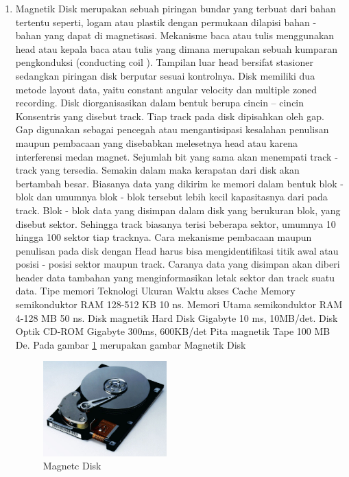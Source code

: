 \begin{enumerate}
\item Magnetik Disk merupakan sebuah piringan bundar yang terbuat dari bahan tertentu seperti, logam atau plastik dengan permukaan dilapisi bahan - bahan yang dapat di magnetisasi. Mekanisme baca atau tulis menggunakan head atau kepala baca atau tulis yang dimana merupakan sebuah kumparan pengkonduksi (conducting coil ). Tampilan luar head bersifat stasioner sedangkan piringan disk berputar sesuai kontrolnya. Disk memiliki dua metode layout data, yaitu  constant angular velocity dan multiple zoned recording. Disk diorganisasikan dalam bentuk berupa cincin – cincin
Konsentris yang disebut track. Tiap track pada disk dipisahkan oleh gap. Gap digunakan sebagai pencegah atau mengantisipasi kesalahan penulisan maupun pembacaan yang disebabkan melesetnya head atau karena interferensi medan magnet. Sejumlah bit yang sama akan menempati track - track yang tersedia. Semakin dalam maka kerapatan dari disk akan bertambah besar. Biasanya data yang dikirim ke memori dalam bentuk blok - blok dan umumnya blok - blok tersebut lebih kecil kapasitasnya dari pada track. Blok - blok data yang disimpan dalam disk yang berukuran blok, yang disebut sektor. Sehingga track biasanya terisi beberapa sektor, umumnya 10 hingga 100 sektor tiap tracknya. Cara mekanisme pembacaan maupun penulisan pada disk dengan Head harus bisa mengidentifikasi titik awal atau posisi - posisi sektor maupun track. Caranya data yang disimpan akan diberi header data tambahan yang menginformasikan letak sektor dan track suatu data. Tipe memori Teknologi Ukuran Waktu akses Cache Memory semikonduktor RAM 128-512 KB 10 ns. Memori Utama semikonduktor RAM 4-128 MB 50 ns. Disk magnetik Hard Disk Gigabyte 10 ms, 10MB/det. Disk Optik CD-ROM Gigabyte 300ms, 600KB/det Pita magnetik Tape 100 MB De. Pada gambar \ref{labelgambar4} merupakan gambar Magnetik Disk
\begin{figure}[htbp]
\centering
\includegraphics[width=0.45\textwidth]{figures/image/magnetic_disk.jpg}
\caption{Magnetc Disk}
\label{labelgambar4}
\end{figure}

\end{enumerate}


